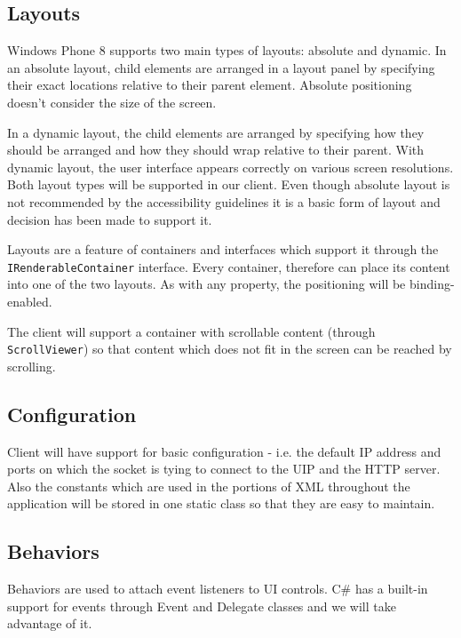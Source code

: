 
\subsection{Layouts}
Windows Phone 8 supports two main types of layouts: absolute and dynamic.
In an absolute layout, child elements are arranged in a layout panel by specifying their exact locations relative to their parent element. Absolute positioning doesn't consider the size of the screen.

In a dynamic layout, the child elements are arranged by specifying how they should be arranged and how they should wrap relative to their parent. With dynamic layout, the user interface appears correctly on various screen resolutions.\\

Both layout types will be supported in our client. Even though absolute layout is not recommended by the accessibility guidelines \cite{wp8guide} it is a basic form of layout and decision has been made to support it.

Layouts are a feature of containers and interfaces which support it through the \texttt{IRenderableContainer} interface. Every container, therefore can place its content into one of the two layouts. As with any property, the positioning will be binding-enabled.

The client will support a container with scrollable content (through \texttt{ScrollViewer}) so that content which does not fit in the screen can be reached by scrolling.

\subsection{Configuration}
Client will have support for basic configuration - i.e. the default IP address and ports on which the socket is tying to connect to the UIP and the HTTP server. Also the constants which are used in the portions of XML throughout the application will be stored in one static class so that they are easy to maintain. 

\subsection{Behaviors}
Behaviors are used to attach event listeners to UI controls. C\# has a built-in support for events through Event and Delegate classes and we will take advantage of it.

